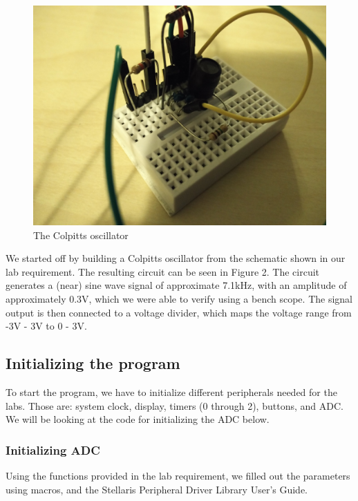 \documentclass[12pt,oneside,letterpaper]{article}
\begin{document}
\begin{figure}[h]
  \includegraphics[width=\linewidth]{assets/circuit.jpg}
  \caption{The Colpitts oscillator}
  \label{fig:circuit}
\end{figure}

We started off by building a Colpitts oscillator from the schematic shown in our lab requirement. The resulting circuit can be seen in Figure 2. The circuit generates a (near) sine wave signal of approximate 7.1kHz, with an amplitude of approximately 0.3V, which we were able to verify using a bench scope. The signal output is then connected to a voltage divider, which maps the voltage range from -3V - 3V to 0 - 3V.

\subsection{Initializing the program}

To start the program, we have to initialize different peripherals needed for the labs. Those are: system clock, display, timers (0 through 2), buttons, and ADC. We will be looking at the code for initializing the ADC below.

\subsubsection{Initializing ADC}
Using the functions provided in the lab requirement, we filled out the parameters using macros, and the Stellaris Peripheral Driver Library User's Guide.

\end{document}
